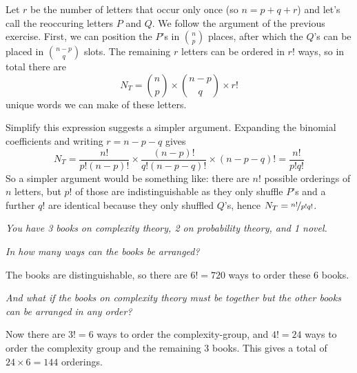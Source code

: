 \documentclass[a4paper,10pt,landscape,twocolumn]{scrartcl}
\begin{document}
\begin{exercise}[Words]
  \begin{solution}
    Let $r$ be the number of letters that occur only once (so $n = p + q + r$)
    and let's call the reoccuring letters $P$ and $Q$. We follow the argument
    of the previous exercise. First, we can position the $P$'s in ${n \choose 
    p}$ places, after which the ${Q}$'s can be placed in ${{n-p} \choose q}$
    slots. The remaining $r$ letters can be ordered in $r!$ ways, so in total
    there are 
    \[
      N_T = {n \choose p} \times {{n-p} \choose q} \times r!
    \]
    unique words we can make of these letters.
    
    Simplify this expression suggests a simpler argument. Expanding the
    binomial coefficients and writing $r = n - p - q$ gives
    \[
      N_T 
        = \frac{n!}{p!(n-p)!} 
            \times \frac{(n-p)!}{q!(n-p-q)!} 
            \times (n-p-q)!
        = \frac{n!}{p!q!}
    \]
    So a simpler argument would be something like: there are $n!$ possible
    orderings of $n$ letters, but $p!$ of those are indistinguishable as they
    only shuffle $P$'s and a further $q!$ are identical because they only
    shuffled $Q$'s, hence $N_T = \nicefrac{n!}{p!q!}$. 
	\end{solution}
	
\end{exercise}


\begin{exercise}[Books]
  {\itshape You have 3 books on complexity theory, 2 on probability theory,
  and 1 novel.}

  \begin{subex}\itshape
    In how many ways can the books be arranged?	
  \end{subex}
  
  \begin{solution}	
    The books are distinguishable, so there are $6! = 720$ ways to order these
    $6$ books.
  \end{solution}

  
  \begin{subex}\itshape
    And what if the books on complexity theory must be together but the other
    books can be arranged in any order?
  \end{subex}
  
  \begin{solution}
    Now there are $3!=6$ ways to order the complexity-group, and $4!=24$ ways
    to order the complexity group and the remaining 3 books. This gives a total
    of $24\times 6 = 144$ orderings.
  \end{solution}
\end{exercise}
\end{document}
